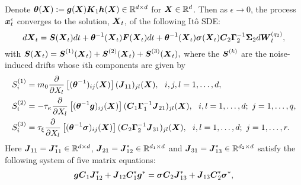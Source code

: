 \begin{theorem}
Denote $\boldsymbol{\theta}(\boldsymbol{X}) := \boldsymbol{g}(\boldsymbol{X})\boldsymbol{K}_1 \boldsymbol{h}(\boldsymbol{X}) \in \mathbb{R}^{d \times d}$ for $\boldsymbol{X} \in \mathbb{R}^d$. Then as $\epsilon \to 0$, the process $\boldsymbol{x}^\epsilon_{t}$ converges to the solution, $\boldsymbol{X}_{t}$, of the following It\^o SDE:
\begin{equation} \label{general_limitSDE}
d\boldsymbol{X}_{t} = \boldsymbol{S}(\boldsymbol{X}_{t}) dt + \boldsymbol{\theta}^{-1}(\boldsymbol{X}_t) \boldsymbol{F}(\boldsymbol{X}_{t}) dt + \boldsymbol{\theta}^{-1}(\boldsymbol{X}_t)  \boldsymbol{\sigma}(\boldsymbol{X}_{t}) \boldsymbol{C}_2 \boldsymbol{\Gamma}_2^{-1} \boldsymbol{\Sigma}_2 d\boldsymbol{W}^{(q_2)}_{t},
\end{equation}
with $\boldsymbol{S}(\boldsymbol{X}_{t}) = \boldsymbol{S}^{(1)}(\boldsymbol{X}_{t}) + \boldsymbol{S}^{(2)}(\boldsymbol{X}_{t}) + \boldsymbol{S}^{(3)}(\boldsymbol{X}_{t}),$ where the $\boldsymbol{S}^{(k)}$ are the noise-induced drifts whose $i$th components are given by 
\begin{align}
S^{(1)}_{i} &= m_{0} \frac{\partial}{\partial X_{l}}\left[(\boldsymbol{\theta}^{-1})_{ij}(\boldsymbol{X})\right] (\boldsymbol{J}_{11})_{jl}(\boldsymbol{X}), \ \
i,j,l = 1, \dots, d, \label{gen_nid1} \\ 
S^{(2)}_{i} &= -\tau_{\kappa} \frac{\partial}{\partial X_{l}}\left[(\boldsymbol{\theta}^{-1} \boldsymbol{g})_{ij}(\boldsymbol{X})\right] (\boldsymbol{C}_1 \boldsymbol{\Gamma}_1^{-1} \boldsymbol{J}_{21})_{jl}(\boldsymbol{X}), \ \ i,l = 1, \dots, d; \ j = 1,\dots,q, \label{gen_nid2} \\ 
S^{(3)}_{i} &= \tau_{\xi} \frac{\partial}{\partial X_{l}}\left[(\boldsymbol{\theta}^{-1}\boldsymbol{\sigma} )_{ij}(\boldsymbol{X}) \right] (\boldsymbol{C}_2 \boldsymbol{\Gamma}_2^{-1} \boldsymbol{J}_{31})_{jl}(\boldsymbol{X}), \ \ i,l = 1, \dots, d; \ j=1,\dots,r. \label{gen_nid3}
\end{align} 
Here 
$\boldsymbol{J}_{11} = \boldsymbol{J}_{11}^* \in \mathbb{R}^{d\times d}$, $\boldsymbol{J}_{21}=\boldsymbol{J}_{12}^* \in \mathbb{R}^{d_1 \times d}$ and $\boldsymbol{J}_{31} = \boldsymbol{J}_{13}^* \in \mathbb{R}^{d_2 \times d}$  satisfy the following system of five matrix equations: 
\begin{align}
\vecc{g} \vecc{C}_1 \vecc{J}_{12}^* + \vecc{J}_{12} \vecc{C}_1^* \vecc{g}^* &= \vecc{\sigma} \vecc{C}_2 \vecc{J}_{13}^* + \vecc{J}_{13} \vecc{C}_2^* \vecc{\sigma}^*, \label{gen_system} \\

\end{align}
\end{theorem}
